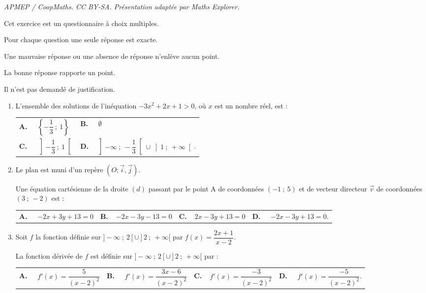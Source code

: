 \documentclass[10pt]{article}
\providecommand{\vv}[1]{\overrightarrow{#1}}
\providecommand{\vv}[1]{{\overrightarrow{#1}}}
\begin{document}
\noindent\textit{APMEP / CoopMaths. CC BY-SA. Présentation adaptée par Maths Explorer.}\par\medskip
\medskip
Cet exercice est un questionnaire à choix multiples. 

Pour chaque question une seule réponse est exacte. 

Une mauvaise réponse ou une absence de réponse n'enlève aucun point. 

La bonne réponse rapporte un point.

Il n'est pas demandé de justification.

\medskip

\begin{enumerate}
\item L'ensemble des solutions de l'inéquation $-3x^2+2x+1>0$, où $x$ est un nombre réel, est :

\begin{tabularx}{\linewidth}{*{2}{X}}
\textbf{A.~~} $\left\{-\dfrac{1}{3}~;~1\right\} $ &\textbf{B.~~} $\emptyset$\\\textbf{C.~~ }$\left]-\dfrac{1}{3}~;~1\right[  $& \textbf{D.~~}$\left]-\infty~;~-\dfrac{1}{3}\right[\cup\left]1~;~+\infty\right[ $.
\end{tabularx}
\medskip

\item Le plan est muni d'un repère $(O;\vv{i},\vv{j})$.

Une équation cartésienne de la droite $(d)$ passant par le point A de coordonnées $(-1~;~5)$ et de vecteur directeur $\vv{v}$ de coordonnées $(3~;~-2)$ est :

\medskip

\begin{tabularx}{\linewidth}{*{4}{X}}
\textbf{A.~~} $-2x+3y+13=0$&\textbf{B.~~}$-2x-3y-13=0 $&\textbf{C.~~}$2x - 3y + 13 = 0 $& \textbf{D.~~} \small $-2x - 3y + 13 = 0$.
\end{tabularx}

\medskip

\item Soit $f$ la fonction définie sur $]-\infty~;~2[ \cup  ]2~;~+\infty[$ par $f(x)=\dfrac{2x+1}{x - 2}$.

La fonction dérivée de $f$ est définie sur $]-\infty~;~2[ \cup  ]2~;~+\infty[$ par :

\medskip

\begin{tabularx}{\linewidth}{*{4}{X}}
\textbf{A.~~} $ f'(x)=\dfrac{5}{(x-2)^2}$ &\textbf{B.~~} $f'(x)= \dfrac{3x-6}{(x-2)^2} $&\textbf{C.~~}$f'(x)=\dfrac{-3}{(x-2)^2} $& \textbf{D.~~} $ f'(x) = \dfrac{-5}{(x-2)^2 }$.
\end{tabularx}


\end{enumerate}
\end{document}
